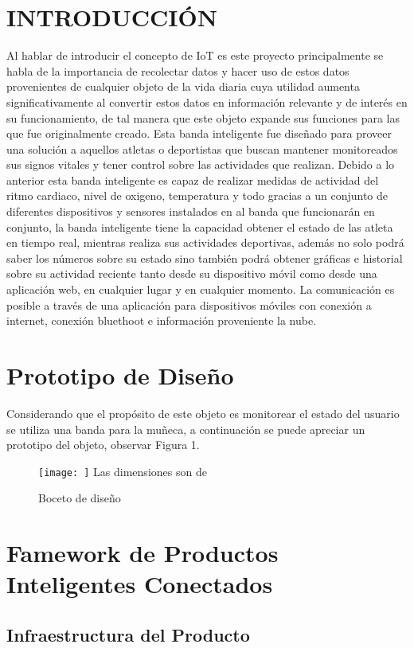 \documentclass[osajnl,twocolumn,showpacs,superscriptaddress,10pt]{revtex4-1}
\begin{document}
\section{INTRODUCCIÓN}
Al hablar de introducir el concepto de IoT es este proyecto principalmente se habla de la importancia de recolectar datos y hacer uso de estos datos provenientes de cualquier objeto de la vida diaria cuya utilidad aumenta significativamente al convertir estos datos en información relevante y de interés en su funcionamiento, de tal manera que este objeto expande sus funciones para las que fue originalmente creado. Esta banda inteligente fue diseñado para proveer una solución a aquellos atletas o deportistas que buscan mantener monitoreados sus signos vitales y tener control sobre las actividades que realizan. Debido a lo anterior esta banda inteligente es capaz de realizar medidas de actividad del ritmo cardiaco, nivel de oxigeno, temperatura y todo gracias a un conjunto de diferentes dispositivos y sensores instalados en al banda que funcionarán en conjunto, la banda inteligente tiene la capacidad obtener el estado de las atleta en tiempo real, mientras realiza sus actividades deportivas, además no solo podrá saber los números sobre su estado sino también podrá obtener gráficas e historial sobre su actividad reciente tanto desde su dispositivo móvil como desde una aplicación web, en cualquier lugar y en cualquier momento. La comunicación es posible a través de una aplicación para dispositivos móviles con conexión a internet, conexión bluethoot e información proveniente la nube.

\section{Prototipo de Diseño}
Considerando que el propósito de este objeto es monitorear el estado del usuario se utiliza una banda para la muñeca, a continuación se puede apreciar un prototipo del objeto, observar Figura 1.


\begin{figure} [H] \centering 
\caption{Boceto de diseño}

\texttt{[image: ]} 
Las dimensiones son de 
\end{figure}

\section{Famework de Productos Inteligentes Conectados}
\subsection{Infraestructura del Producto}
\end{document}
